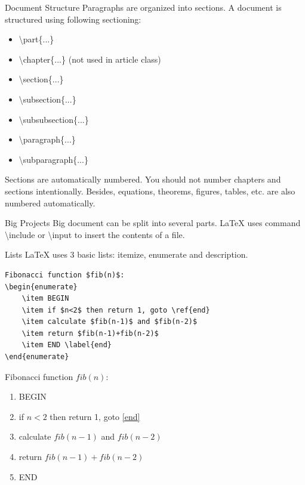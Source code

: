 \documentclass[10pt]{beamer}
\begin{document}
\begin{frame}{Document Structure}
Paragraphs are organized into sections.
A document is structured using following sectioning:
\begin{itemize}
    \item \textbackslash part\{...\}
    \item \textbackslash chapter\{...\} (\alert{not used in article class})
    \item \textbackslash section\{...\}
    \item \textbackslash subsection\{...\}
    \item \textbackslash subsubsection\{...\}
    \item \textbackslash paragraph\{...\}
    \item \textbackslash subparagraph\{...\}
\end{itemize}

Sections are automatically numbered. You should not number chapters
and sections intentionally. Besides, equations, theorems, figures,
tables, etc. are also numbered automatically.
\end{frame}

\begin{frame}{Big Projects}
    Big document can be split into several parts. \LaTeX{} uses
    command \alert{\textbackslash include} or \alert{\textbackslash input}
    to insert the contents of a file.


\end{frame}

\begin{frame}[fragile]{Lists}
    \LaTeX{} uses 3 basic lists: itemize, enumerate and description.

\begin{verbatim}
Fibonacci function $fib(n)$:
\begin{enumerate}
    \item BEGIN
    \item if $n<2$ then return 1, goto \ref{end}
    \item calculate $fib(n-1)$ and $fib(n-2)$
    \item return $fib(n-1)+fib(n-2)$
    \item END \label{end}
\end{enumerate}
\end{verbatim}

\begin{boxedminipage}{0.8\textwidth}
    Fibonacci function $fib(n)$:
\begin{enumerate}
    \item BEGIN
    \item if $n<2$ then return 1, goto \ref{end}
    \item calculate $fib(n-1)$ and $fib(n-2)$
    \item return $fib(n-1)+fib(n-2)$
    \item END \label{end}
\end{enumerate}
    \end{boxedminipage}
\end{frame}
\end{document}
